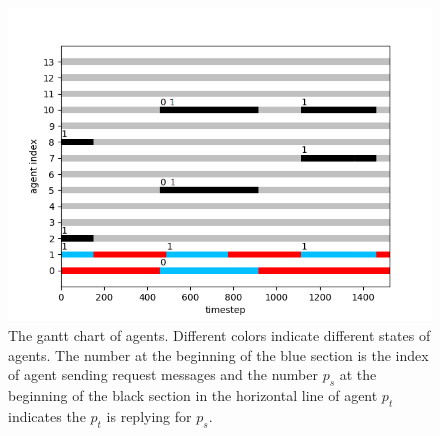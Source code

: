 \documentclass[journal]{IEEEtran}
\begin{document}
\begin{figure}[h]	
\centering  	
\includegraphics[width=1\linewidth]{simulate1/gante_no_grid.png}
\caption{The gantt chart of agents. Different colors indicate different states of agents. The number at the beginning of the blue section is the index of agent sending request messages and the number $p_s$ at the beginning of the black section in the horizontal line of agent $p_t$ indicates the $p_t$ is replying for $p_s$.}
\label{Gantt}
\end{figure}

%
\end{document}
